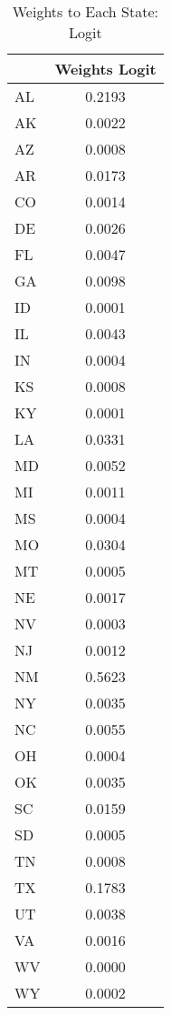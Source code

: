 \begin{table}[htbp]\centering
\caption{Weights to Each State: Logit}
\begin{tabular}{l*{1}{c}}
\toprule
            &Weights Logit\\
\midrule
AL          &      0.2193\\
AK          &      0.0022\\
AZ          &      0.0008\\
AR          &      0.0173\\
CO          &      0.0014\\
DE          &      0.0026\\
FL          &      0.0047\\
GA          &      0.0098\\
ID          &      0.0001\\
IL          &      0.0043\\
IN          &      0.0004\\
KS          &      0.0008\\
KY          &      0.0001\\
LA          &      0.0331\\
MD          &      0.0052\\
MI          &      0.0011\\
MS          &      0.0004\\
MO          &      0.0304\\
MT          &      0.0005\\
NE          &      0.0017\\
NV          &      0.0003\\
NJ          &      0.0012\\
NM          &      0.5623\\
NY          &      0.0035\\
NC          &      0.0055\\
OH          &      0.0004\\
OK          &      0.0035\\
SC          &      0.0159\\
SD          &      0.0005\\
TN          &      0.0008\\
TX          &      0.1783\\
UT          &      0.0038\\
VA          &      0.0016\\
WV          &      0.0000\\
WY          &      0.0002\\
\bottomrule
\end{tabular}
\end{table}
